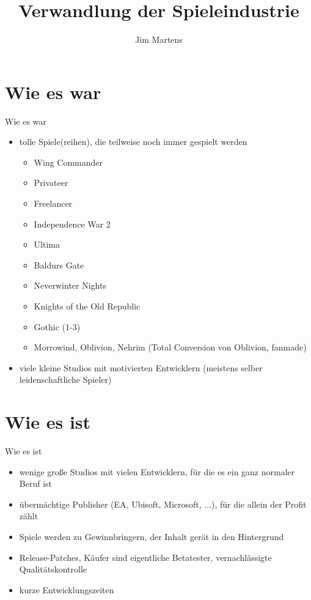 \documentclass{beamer}
\begin{document}
\author{Jim Martens}
\title{Verwandlung der Spieleindustrie}

\section{Wie es war}
\begin{frame}{Wie es war}
	\begin{itemize}
		\item	tolle Spiele(reihen), die teilweise noch immer gespielt werden
		\begin{itemize}
			\item<2->	Wing Commander
			\item<2->	Privateer
			\item<2->	Freelancer
			\item<3->	Independence War 2
			\item<4->	Ultima
			\item<4->	Baldurs Gate
			\item<4->	Neverwinter Nights
			\item<4->	Knights of the Old Republic
			\item<5->	Gothic (1-3)
			\item<5->	Morrowind, Oblivion, Nehrim (Total Conversion von Oblivion, fanmade)
		\end{itemize}
		\item<6->	viele kleine Studios mit motivierten Entwicklern (meistens selber leidenschaftliche Spieler)
	\end{itemize}
\end{frame}

\section{Wie es ist}
\begin{frame}{Wie es ist}
	\begin{itemize}
		\item	wenige große Studios mit vielen Entwicklern, für die es ein ganz normaler Beruf ist
		\item<2->	übermächtige Publisher (EA, Ubisoft, Microsoft, ...), für die allein der Profit zählt
		\item<3->	Spiele werden zu Gewinnbringern, der Inhalt gerät in den Hintergrund
		\item<4->	Release-Patches, Käufer sind eigentliche Betatester, vernachlässigte Qualitätskontrolle
		\item<5->	kurze Entwicklungszeiten
	\end{itemize}
\end{frame}
\end{document}
